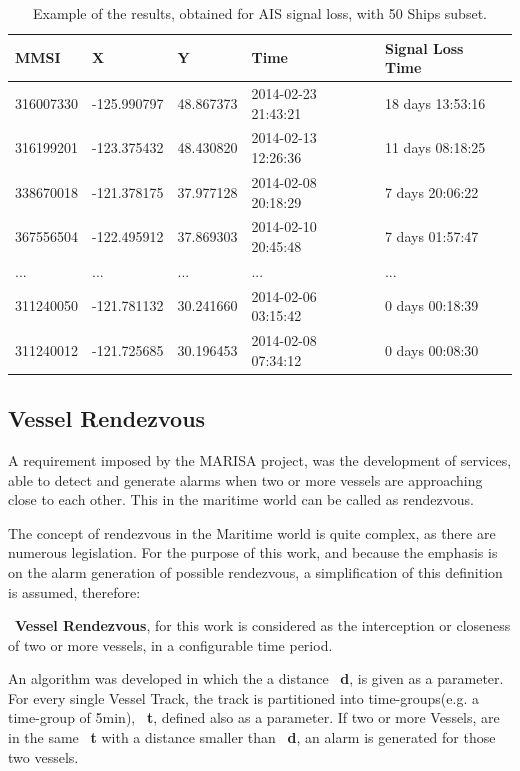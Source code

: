 \begin{table}[H]
\centering
\caption{Example of the results, obtained for AIS signal loss, with 50 Ships subset.}
\label{Table: AIS signal loss}
\begin{tabular}{@{}lllll@{}}
\toprule
MMSI & X & Y & Time & Signal Loss Time \\ \midrule
316007330 & -125.990797 & 48.867373 & 2014-02-23 21:43:21 & 18 days 13:53:16 \\
316199201 & -123.375432 & 48.430820 & 2014-02-13 12:26:36 & 11 days 08:18:25 \\
338670018 & -121.378175 & 37.977128 & 2014-02-08 20:18:29 & 7 days 20:06:22 \\
367556504 & -122.495912 & 37.869303 & 2014-02-10 20:45:48 & 7 days 01:57:47 \\
... & ... & ... & ... & ... \\
311240050 & -121.781132 & 30.241660 & 2014-02-06 03:15:42 & 0 days 00:18:39 \\
311240012 & -121.725685 & 30.196453 & 2014-02-08 07:34:12 & 0 days 00:08:30 \\ \bottomrule
\end{tabular}
\end{table}

\subsection{Vessel Rendezvous}
A requirement imposed by the MARISA project, was the development of services, able to detect and generate alarms when two or more vessels are approaching close to each other. This in the maritime world can be called as rendezvous.

The concept of rendezvous in the Maritime world is quite complex, as there are numerous legislation. For the purpose of this work, and because the emphasis is on the alarm generation of possible rendezvous, a simplification of this definition is assumed, therefore: 

~\textbf{Vessel Rendezvous}, for this work is considered as the interception or closeness of two or more vessels, in a configurable time period.

An algorithm was developed in which the a distance ~\textbf{d}, is given as a parameter. For every single Vessel Track, the track is partitioned into time-groups(e.g. a time-group of 5min), ~\textbf{t}, defined also as a parameter. If two or more Vessels, are in the same ~\textbf{t} with a distance smaller than ~\textbf{d}, an alarm is generated for those two vessels.

